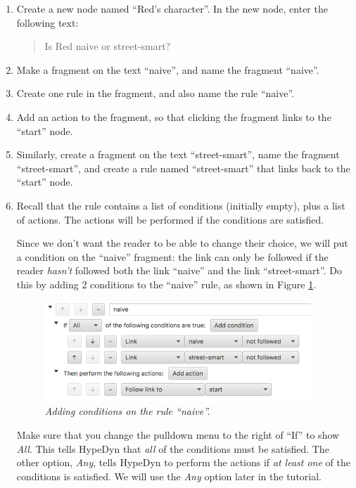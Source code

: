 \documentclass{article}
\begin{document}
\begin{enumerate}
  \item Create a new node named ``Red's character''. In the new node, enter the following text:

\begin{quotation}
\noindent Is Red naive or street-smart?
\end{quotation}

\item Make a fragment on the text ``naive'', and name the fragment ``naive''.

\item Create one rule in the fragment, and also name the rule ``naive''.

\item Add an action to the fragment, so that clicking the fragment links to the ``start'' node.

\item Similarly, create a fragment on the text ``street-smart'', name the fragment ``street-smart'', and create a rule named ``street-smart'' that links back to the ``start'' node.

\item Recall that the rule contains a list of conditions (initially empty), plus a list of actions. The actions will be performed if the conditions are satisfied.

Since we don't want the reader to be able to change their choice, we will put a condition on the ``naive'' fragment: the link can only be followed if the reader \textit{hasn't} followed both the link ``naive'' and the link ``street-smart''. Do this by adding 2 conditions to the ``naive'' rule, as shown in Figure \ref{fig:tut2:red_is_naive}.

\begin{figure}[h]
  \centering
  \includegraphics[width=10cm]{images/hypedyn-tutorial-2-figure-2}
  \caption{\textit{Adding conditions on the rule ``naive''.}}
  \label{fig:tut2:red_is_naive}
\end{figure} 

\noindent Make sure that you change the pulldown menu to the right of ``If'' to show \textit{All}. This tells HypeDyn that \textit{all} of the conditions must be satisfied. The other option, \textit{Any}, tells HypeDyn to perform the actions if \textit{at least one} of the conditions is satisfied. We will use the \textit{Any} option later in the tutorial.


\end{enumerate}
\end{document}
